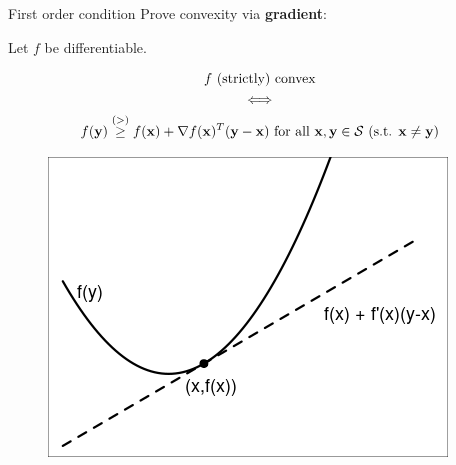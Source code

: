 \documentclass[11pt,compress,t,notes=noshow, xcolor=table]{beamer}
\begin{document}
\begin{vbframe}{First order condition}
Prove convexity via \textbf{gradient}:

\vspace{-0.5\baselineskip}

\begin{kframe}
    Let $f$ be differentiable.

    \vspace{-\baselineskip}

    \begin{gather*}
        \textnormal{$f$ (strictly) convex} \\
        \Longleftrightarrow \\
        f(\mathbf{y}) \overset{(>)}{\geq} f(\mathbf{x}) + \nabla f(\mathbf{x})^T (\mathbf{y}-\mathbf{x}) \textnormal{ for all $\mathbf{x},\mathbf{y}\in\mathcal{S}$ (s.t. $\mathbf{x} \not= \mathbf{y}$)}
    \end{gather*}
\end{kframe}

\vspace{-0.2cm}

\begin{figure}
    \centering
    \includegraphics[width=0.4\linewidth]{figure_man/conv-first-order-cond.png}
\end{figure}

\end{vbframe}
\end{document}
